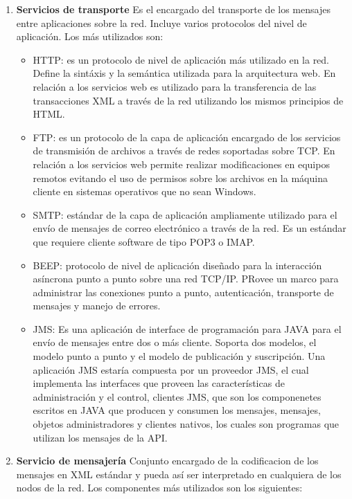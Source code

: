	
	\begin{enumerate}
		\item \textbf{Servicios de transporte}
					Es el encargado del transporte de los mensajes entre aplicaciones sobre la red. Incluye varios protocolos del nivel de aplicación. Los más utilizados son:
					
					\begin{itemize}
						\item HTTP: es un protocolo de nivel de aplicación más utilizado en la red. Define la sintáxis y la semántica utilizada para la arquitectura web. En relación a los servicios web es utilizado para la transferencia de las transacciones XML a través de la red utilizando los mismos principios de HTML.
						\item FTP: es un protocolo de la capa de aplicación encargado de los servicios de transmisión de archivos a través de redes soportadas sobre TCP. En relación a los servicios web permite realizar modificaciones en equipos remotos evitando el uso de permisos sobre los archivos en la máquina cliente en sistemas operativos que no sean Windows.
						\item SMTP: estándar de la capa de aplicación ampliamente utilizado para el envío de mensajes de correo electrónico a través de la red. Es un estándar que requiere cliente software de tipo POP3 o IMAP.
						\item BEEP: protocolo de nivel de aplicación diseñado para la interacción asíncrona punto a punto sobre una red TCP/IP. PRovee un marco para administrar las conexiones punto a punto, autenticación, transporte de mensajes y manejo de errores.
						\item JMS: Es una aplicación de interface de programación para JAVA para el envío de mensajes entre dos o más cliente. Soporta dos modelos, el modelo punto a punto y el modelo de publicación y suscripción. Una aplicación JMS estaría compuesta por un proveedor JMS, el cual implementa las interfaces que proveen las características de administración y el control, clientes JMS, que son los componenetes escritos en JAVA que producen y consumen los mensajes, mensajes, objetos administradores y clientes nativos, los cuales son programas que utilizan los mensajes de la API.
					\end{itemize}
		\item \textbf{Servicio de mensajería}
			Conjunto encargado de la codificacion de los mensajes en XML estándar y pueda así ser interpretado en cualquiera de los nodos de la red. Los componentes más utilizados son los siguientes:
			

\end{enumerate}
